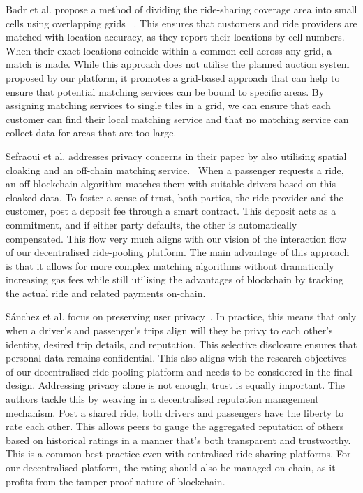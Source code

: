 Badr et al. propose a method of dividing the ride-sharing coverage area into small cells using overlapping grids ~\cite{Badr.}. This ensures that customers and ride providers are matched with location accuracy, as they report their locations by cell numbers. When their exact locations coincide within a common cell across any grid, a match is made. While this approach does not utilise the planned auction system proposed by our platform, it promotes a grid-based approach that can help to ensure that potential matching services can be bound to specific areas. By assigning matching services to single tiles in a grid, we can ensure that each customer can find their local matching service and that no matching service can collect data for areas that are too large.


Sefraoui et al. addresses privacy concerns in their paper by also utilising spatial cloaking and an off-chain matching service.~\cite{Vazquez.} When a passenger requests a ride, an off-blockchain algorithm matches them with suitable drivers based on this cloaked data. To foster a sense of trust, both parties, the ride provider and the customer, post a deposit fee through a smart contract. This deposit acts as a commitment, and if either party defaults, the other is automatically compensated. This flow very much aligns with our vision of the interaction flow of our decentralised ride-pooling platform. The main advantage of this approach is that it allows for more complex matching algorithms without dramatically increasing gas fees while still utilising the advantages of blockchain by tracking the actual ride and related payments on-chain. 

Sánchez et al. focus on preserving user privacy~\cite{Sanchez.2016}. In practice, this means that only when a driver's and passenger's trips align will they be privy to each other's identity, desired trip details, and reputation. This selective disclosure ensures that personal data remains confidential. This also aligns with the research objectives of our decentralised ride-pooling platform and needs to be considered in the final design.
Addressing privacy alone is not enough; trust is equally important. The authors tackle this by weaving in a decentralised reputation management mechanism. Post a shared ride, both drivers and passengers have the liberty to rate each other. This allows peers to gauge the aggregated reputation of others based on historical ratings in a manner that's both transparent and trustworthy. This is a common best practice even with centralised ride-sharing platforms. For our decentralised platform, the rating should also be managed on-chain, as it profits from the tamper-proof nature of blockchain.

